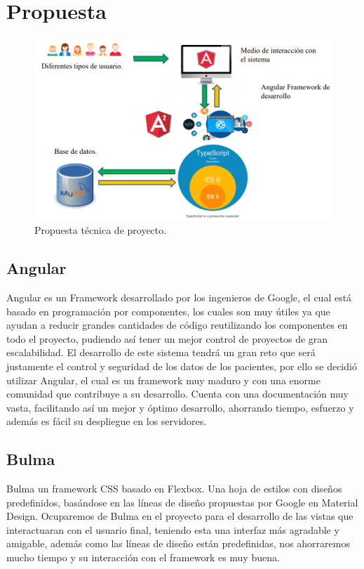 \chapter{Propuesta}
\begin{figure}[h]
  \label{figurapropuesta}
  \centering
  \includegraphics[scale=.5]{lib/assets/propuesta-tecnica}
  \caption{Propuesta técnica de proyecto.}
\end{figure}

\section{Angular }
Angular es un Framework desarrollado por los ingenieros de Google, el cual está basado en programación por componentes, los cuales son muy útiles ya que ayudan a reducir grandes cantidades de código reutilizando los componentes en todo el proyecto, pudiendo así tener un mejor control de proyectos de gran escalabilidad. El desarrollo de este sistema tendrá un gran reto que será justamente el control y seguridad de los datos de los pacientes, por ello se decidió utilizar Angular, el cual es un framework muy maduro y con una enorme comunidad que contribuye a su desarrollo. Cuenta con una documentación muy vasta, facilitando así un mejor y óptimo desarrollo, ahorrando tiempo, esfuerzo y además es fácil su despliegue en los servidores. \cite{Angular}

\section{Bulma}
Bulma un framework CSS basado en Flexbox. Una hoja de estilos con diseños predefinidos, basándose en las líneas de diseño propuestas por Google en Material Design.
Ocuparemos de Bulma en el proyecto para el desarrollo de las vistas que interactuaran con el usuario final, teniendo esta una interfaz más agradable y amigable, además como las líneas de diseño están predefinidas, nos ahorraremos mucho tiempo y su interacción con el framework es muy buena. \cite{Bulma}

